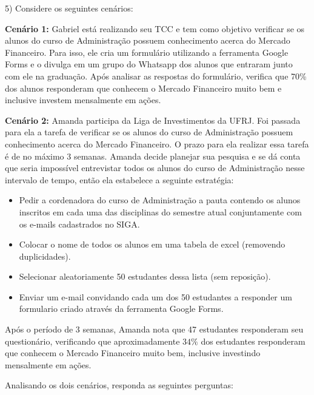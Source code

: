 \documentclass[12pt]{article}
\begin{document}
5) Considere os seguintes cenários:

\textbf{Cenário 1:}
Gabriel está realizando seu TCC e tem como objetivo verificar se os alunos do curso de Administração possuem conhecimento acerca do Mercado Financeiro. Para isso, ele cria 
um formulário utilizando a ferramenta Google Forms e o divulga em um grupo do Whatsapp dos alunos que entraram junto com ele na graduação. Após analisar as respostas do formulário, 
verifica que 70\% dos alunos responderam que conhecem o Mercado Financeiro muito bem e inclusive investem mensalmente em ações. 

\textbf{Cenário 2:}
Amanda participa da Liga de Investimentos da UFRJ. Foi passada para ela a tarefa de verificar se os alunos do curso de Administração possuem conhecimento acerca do Mercado Financeiro. 
O prazo para ela realizar essa tarefa é de no máximo 3 semanas. Amanda decide planejar sua pesquisa e se dá conta que seria impossível entrevistar 
todos os alunos do curso de Administração nesse intervalo de tempo, então ela estabelece a seguinte estratégia:

\begin{itemize}
    \item Pedir a cordenadora do curso de Administração a pauta contendo os alunos inscritos em cada uma das disciplinas do semestre atual conjuntamente com os e-mails cadastrados no SIGA.
    \item Colocar o nome de todos os alunos em uma tabela de excel (removendo duplicidades).
    \item Selecionar aleatoriamente 50 estudantes dessa lista (sem reposição).
    \item Enviar um e-mail convidando cada um dos 50 estudantes a responder um formulario criado através da ferramenta Google Forms. 
\end{itemize}

Após o período de 3 semanas, Amanda nota que 47 estudantes responderam seu questionário,
verificando que aproximadamente $34\%$ dos estudantes responderam que conhecem o Mercado Financeiro muito bem, inclusive investindo mensalmente em ações.   

Analisando os dois cenários, responda as seguintes perguntas:
\end{document}
